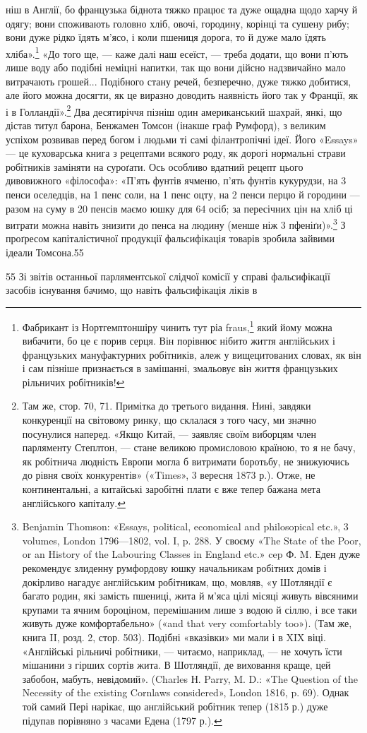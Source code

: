 ніш в Англії, бо французька біднота тяжко працює та дуже
ощадна щодо харчу й одягу; вони споживають головно хліб,
овочі, городину, корінці та сушену рибу; вони дуже рідко їдять
м’ясо, і коли пшениця дорога, то й дуже мало їдять хліба».\footnote{
Фабрикант із Нортгемптоншіру чинить тут ріа fraus,\footnote*{
— благочестивий обман. Ред.
} який йому
можна вибачити, бо це є порив серця. Він порівнює нібито життя англійських
і французьких мануфактурних робітників, алеж у вищецитованих
словах, як він і сам пізніше признається в замішанні, змальовує він
життя французьких рільничих робітників!
}
«До того ще, — каже далі наш есеїст, — треба додати, що вони
п’ють лише воду або подібні неміцні напитки, так що вони дійсно
надзвичайно мало витрачають грошей... Подібного стану речей,
безперечно, дуже тяжко добитися, але його можна досягти, як
це виразно доводить наявність його так у Франції, як і в Голландії».\footnote{
Там же, стор. 70, 71. Примітка до третього видання. Нині, завдяки
конкуренції на світовому ринку, що склалася з того часу, ми значно
посунулися наперед. «Якщо Китай, — заявляє своїм виборцям член парляменту
Степлтон, — стане великою промисловою країною, то я не бачу,
як робітнича людність Европи могла б витримати боротьбу, не знижуючись
до рівня своїх конкурентів» («Times», 3 вересня 1873 р.). Отже,
не континентальні, а китайські заробітні плати є вже тепер бажана
мета англійського капіталу.
} Два десятиріччя пізніш один американський шахрай,
янкі, що дістав титул барона, Бенжамен Томсон (інакше граф
Румфорд), з великим успіхом розвивав перед богом і людьми ті
самі філантропічні ідеї. Його «Essays» — це куховарська книга
з рецептами всякого роду, як дорогі нормальні страви робітників
заміняти на суроґати. Ось особливо вдатний рецепт цього
дивовижного «філософа»: «П’ять фунтів ячменю, п’ять фунтів
кукурудзи, на 3 пенси оселедців, на 1 пенс соли, на 1 пенс оцту,
на 2 пенси перцю й городини — разом на суму в 20 пенсів
маємо юшку для 64 осіб; за пересічних цін на хліб ці витрати
можна навіть знизити до  пенса на людину (менше ніж 3 пфеніґи)».\footnote{
Benjamin Thomson: «Essays, political, economical and philosopical
etc.», 3 volumes, London 1796—1802, vol. I, p. 288. У своєму «The
State of the Poor, or an History of the Labouring Classes in England etc.»
cep Ф. M. Еден дуже рекомендує злиденну румфордову юшку начальникам
робітних домів і докірливо нагадує англійським робітникам,
що, мовляв, «у Шотляндії є багато родин, які замість пшениці, жита й
м’яса цілі місяці живуть вівсяними крупами та ячним бороціном, перемішаним
лише з водою й сіллю, і все таки живуть дуже комфортабельно»
(«and that very comfortably too»). (Там же, книга II, розд. 2, стор. 503).
Подібні «вказівки» ми мали і в XIX віці. «Англійські рільничі робітники,
— читаємо, наприклад, — не хочуть їсти мішанини з гірших сортів
жита. В Шотляндії, де виховання краще, цей забобон, мабуть, невідомий».
(Charles Н. Parry, M. D.: «The Question of the Necessity of the
existing Cornlaws considered», London 1816, p. 69). Однак той самий
Пері нарікає, що англійський робітник тепер (1815 р.) дуже підупав
порівняно з часами Едена (1797 р.).
}
З проґресом капіталістичної продукції фальсифікація
товарів зробила зайвими ідеали Томсона.55

55 Зі звітів останньої парляментської слідчої комісії у справі фальсифікації
засобів існування бачимо, що навіть фальсифікація ліків в
